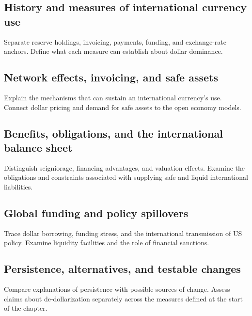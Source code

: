 \label{sec:dollar}

\subsection{History and measures of international currency use}
Separate reserve holdings, invoicing, payments, funding, and exchange-rate
anchors. Define what each measure can establish about dollar dominance.

\subsection{Network effects, invoicing, and safe assets}
Explain the mechanisms that can sustain an international currency's use.
Connect dollar pricing and demand for safe assets to the open economy models.

\subsection{Benefits, obligations, and the international balance sheet}
Distinguish seigniorage, financing advantages, and valuation effects.
Examine the obligations and constraints associated with supplying safe and
liquid international liabilities.

\subsection{Global funding and policy spillovers}
Trace dollar borrowing, funding stress, and the international transmission of
US policy. Examine liquidity facilities and the role of financial sanctions.

\subsection{Persistence, alternatives, and testable changes}
Compare explanations of persistence with possible sources of change.
Assess claims about de-dollarization separately across the measures defined
at the start of the chapter.
